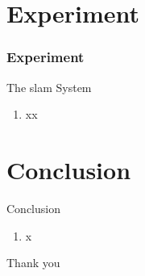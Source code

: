 \documentclass[14pt,hyperref={CJKbookmarks=true}]{beamer}
\theoremstyle{plain}
\theoremstyle{definition}
\theoremstyle{remark}
\begin{document}
\section{Experiment}
\begin{frame}
\frametitle{Experiment}
\begin{block}{The slam System}
\begin{enumerate}
\item xx
\end{enumerate}
\end{block}
\end{frame}


\section{Conclusion}
\begin{frame}{Conclusion}
\small
\begin{enumerate}
\item  x
\end{enumerate}
\end{frame}
\begin{frame}
\Huge
\begin{center}
Thank you
\end{center}


\end{frame}
\end{document}
